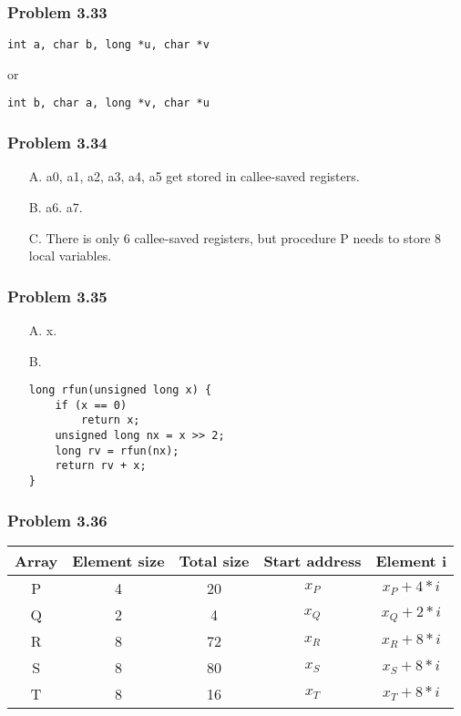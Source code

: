 \documentclass[a4paper]{article}
\begin{document}
\subsubsection*{Problem 3.33}
\begin{lstlisting}
int a, char b, long *u, char *v
\end{lstlisting}
or 
\begin{lstlisting}
int b, char a, long *v, char *u
\end{lstlisting}

\subsubsection*{Problem 3.34}
\begin{enumerate}
    \item [A.] a0, a1, a2, a3, a4, a5 get stored in callee-saved registers.
    \item [B.] a6. a7.
    \item [C.] There is only 6 callee-saved registers, but procedure P needs to store 8 local variables.
\end{enumerate}

\subsubsection*{Problem 3.35}
\begin{enumerate}
    \item [A.] x.
    \item [B.]
\begin{lstlisting}
long rfun(unsigned long x) {
    if (x == 0) 
        return x;
    unsigned long nx = x >> 2;
    long rv = rfun(nx);
    return rv + x;
}
\end{lstlisting}
\end{enumerate}

\subsubsection*{Problem 3.36}
\begin{tabular}{ccccc}
    Array&Element size&Total size&Start address&Element i\\
    \hline
    P&4&20&$x_P$&$x_P+4*i$\\
    Q&2&4&$x_Q$&$x_Q+2*i$\\
    R&8&72&$x_R$&$x_R+8*i$\\
    S&8&80&$x_S$&$x_S+8*i$\\
    T&8&16&$x_T$&$x_T+8*i$\\
\end{tabular}
\end{document}
